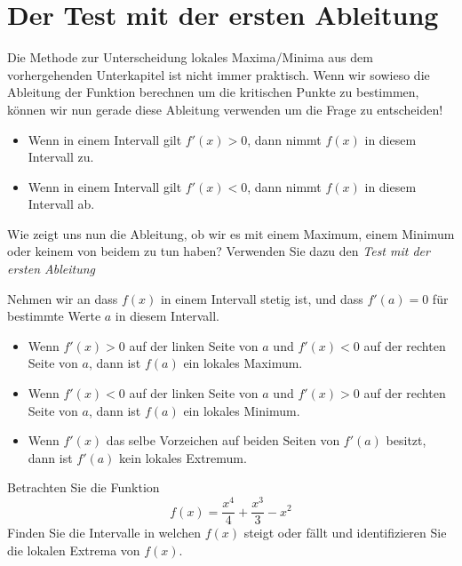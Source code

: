 \section{Der Test mit der ersten Ableitung}

Die Methode zur Unterscheidung lokales Maxima/Minima aus dem vorhergehenden Unterkapitel ist nicht immer praktisch. Wenn wir sowieso die Ableitung der Funktion berechnen um die kritischen Punkte zu bestimmen, können wir nun gerade diese Ableitung verwenden um die Frage zu entscheiden!

\begin{itemize}
\item Wenn in einem Intervall gilt $f'(x) >0$, dann nimmt $f(x)$ in diesem Intervall zu.
\item Wenn in einem Intervall gilt $f'(x) <0$, dann nimmt $f(x)$ in diesem Intervall ab.
\end{itemize}

Wie zeigt uns nun die Ableitung, ob wir es mit einem Maximum, einem Minimum oder keinem von beidem zu tun haben? Verwenden Sie dazu den \textit{Test mit der ersten Ableitung}
\begin{mainTheorem}\label{T:fdt}\hfil
Nehmen wir an dass $f(x)$ in einem Intervall stetig ist, und dass $f'(a)=0$
für bestimmte Werte $a$ in diesem Intervall.
\begin{itemize}
\item Wenn $f'(x)>0$ auf der linken Seite von $a$ und $f'(x)<0$ auf der rechten Seite von
  $a$, dann ist $f(a)$ ein lokales Maximum.
\item Wenn $f'(x)<0$ auf der linken Seite von $a$ und $f'(x)>0$ auf der rechten Seite von
  $a$, dann ist $f(a)$ ein lokales Minimum.
\item Wenn $f'(x)$ das selbe Vorzeichen auf beiden Seiten von $f'(a)$ besitzt,
  dann ist $f'(a)$ kein lokales Extremum.
\end{itemize}
\end{mainTheorem}

\begin{example}\label{E:localextrema}
Betrachten Sie die Funktion 
\[
f(x) = \frac{x^4}{4}+\frac{x^3}{3}-x^2
\]
Finden Sie die Intervalle in welchen $f(x)$ steigt oder fällt und identifizieren Sie die lokalen Extrema von $f(x)$.
\end{example}

